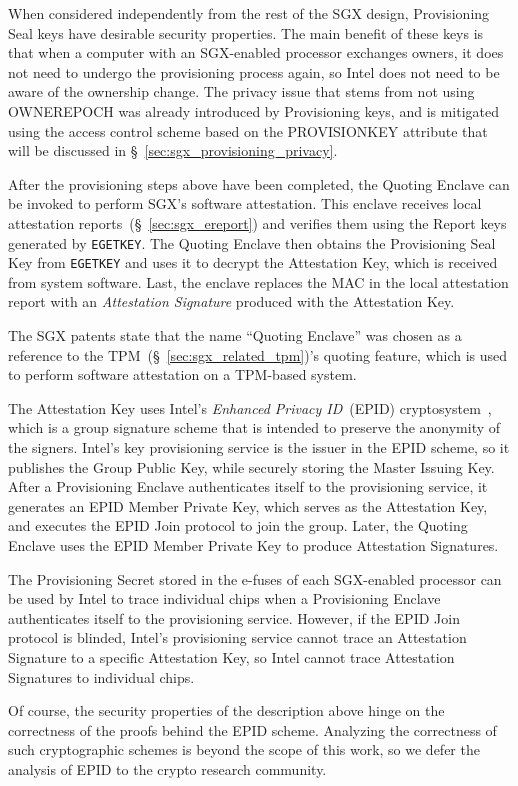 When considered independently from the rest of the SGX design, Provisioning
Seal keys have desirable security properties. The main benefit of these keys is
that when a computer with an SGX-enabled processor exchanges owners, it does
not need to undergo the provisioning process again, so Intel does not need to
be aware of the ownership change. The privacy issue that stems from not using
OWNEREPOCH was already introduced by Provisioning keys, and is mitigated using
the access control scheme based on the PROVISIONKEY attribute that will be
discussed in \S~\ref{sec:sgx_provisioning_privacy}.


After the provisioning steps above have been completed, the Quoting Enclave can
be invoked to perform SGX's software attestation. This enclave receives local
attestation reports~(\S~\ref{sec:sgx_ereport}) and verifies them using the
Report keys generated by \texttt{EGETKEY}. The Quoting Enclave then obtains the
Provisioning Seal Key from \texttt{EGETKEY} and uses it to decrypt the
Attestation Key, which is received from system software. Last, the enclave
replaces the MAC in the local attestation report with an \textit{Attestation
Signature} produced with the Attestation Key.


The SGX patents state that the name ``Quoting Enclave'' was chosen as a
reference to the TPM~(\S~\ref{sec:sgx_related_tpm})'s quoting feature, which is
used to perform software attestation on a TPM-based system.


The Attestation Key uses Intel's \textit{Enhanced Privacy ID}~(EPID)
cryptosystem~\cite{brickell2009epid}, which is a group signature scheme that is
intended to preserve the anonymity of the signers. Intel's key provisioning
service is the issuer in the EPID scheme, so it publishes the Group Public Key,
while securely storing the Master Issuing Key. After a Provisioning Enclave
authenticates itself to the provisioning service, it generates an EPID Member
Private Key, which serves as the Attestation Key, and executes the EPID Join
protocol to join the group. Later, the Quoting Enclave uses the EPID Member
Private Key to produce Attestation Signatures.

The Provisioning Secret stored in the e-fuses of each SGX-enabled processor can
be used by Intel to trace individual chips when a Provisioning Enclave
authenticates itself to the provisioning service. However, if the EPID Join
protocol is blinded, Intel's provisioning service cannot trace an Attestation
Signature to a specific Attestation Key, so Intel cannot trace Attestation
Signatures to individual chips.

Of course, the security properties of the description above hinge on the
correctness of the proofs behind the EPID scheme. Analyzing the correctness of
such cryptographic schemes is beyond the scope of this work, so we defer the
analysis of EPID to the crypto research community.
